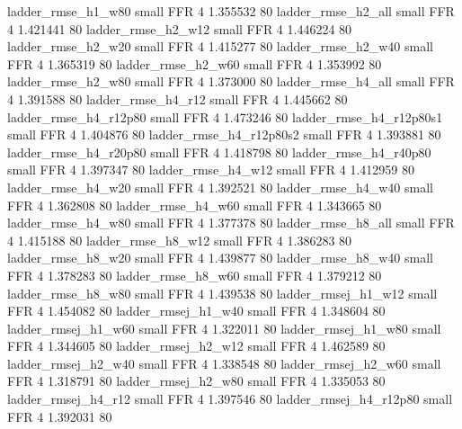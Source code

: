       ladder_rmse_h1_w80      small      FFR                 4 1.355532 80
      ladder_rmse_h2_all      small      FFR                 4 1.421441 80
      ladder_rmse_h2_w12      small      FFR                 4 1.446224 80
      ladder_rmse_h2_w20      small      FFR                 4 1.415277 80
      ladder_rmse_h2_w40      small      FFR                 4 1.365319 80
      ladder_rmse_h2_w60      small      FFR                 4 1.353992 80
      ladder_rmse_h2_w80      small      FFR                 4 1.373000 80
      ladder_rmse_h4_all      small      FFR                 4 1.391588 80
      ladder_rmse_h4_r12      small      FFR                 4 1.445662 80
   ladder_rmse_h4_r12p80      small      FFR                 4 1.473246 80
 ladder_rmse_h4_r12p80s1      small      FFR                 4 1.404876 80
 ladder_rmse_h4_r12p80s2      small      FFR                 4 1.393881 80
   ladder_rmse_h4_r20p80      small      FFR                 4 1.418798 80
   ladder_rmse_h4_r40p80      small      FFR                 4 1.397347 80
      ladder_rmse_h4_w12      small      FFR                 4 1.412959 80
      ladder_rmse_h4_w20      small      FFR                 4 1.392521 80
      ladder_rmse_h4_w40      small      FFR                 4 1.362808 80
      ladder_rmse_h4_w60      small      FFR                 4 1.343665 80
      ladder_rmse_h4_w80      small      FFR                 4 1.377378 80
      ladder_rmse_h8_all      small      FFR                 4 1.415188 80
      ladder_rmse_h8_w12      small      FFR                 4 1.386283 80
      ladder_rmse_h8_w20      small      FFR                 4 1.439877 80
      ladder_rmse_h8_w40      small      FFR                 4 1.378283 80
      ladder_rmse_h8_w60      small      FFR                 4 1.379212 80
      ladder_rmse_h8_w80      small      FFR                 4 1.439538 80
     ladder_rmsej_h1_w12      small      FFR                 4 1.454082 80
     ladder_rmsej_h1_w40      small      FFR                 4 1.348604 80
     ladder_rmsej_h1_w60      small      FFR                 4 1.322011 80
     ladder_rmsej_h1_w80      small      FFR                 4 1.344605 80
     ladder_rmsej_h2_w12      small      FFR                 4 1.462589 80
     ladder_rmsej_h2_w40      small      FFR                 4 1.338548 80
     ladder_rmsej_h2_w60      small      FFR                 4 1.318791 80
     ladder_rmsej_h2_w80      small      FFR                 4 1.335053 80
     ladder_rmsej_h4_r12      small      FFR                 4 1.397546 80
  ladder_rmsej_h4_r12p80      small      FFR                 4 1.392031 80
